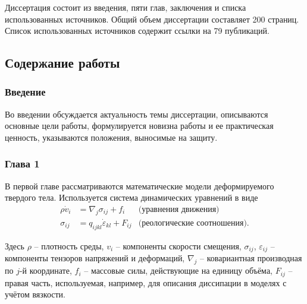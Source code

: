Диссертация состоит из введения, пяти глав, заключения и списка использованных источников. Общий объем диссертации составляет 200 страниц. Список использованных источников содержит ссылки на 79 публикаций.

\subsection*{Содержание работы}



\subsubsection*{Введение}

Во введении обсуждается актуальность темы диссертации, описываются основные цели работы, формулируется новизна работы и ее практическая ценность, указываются положения, выносимые на защиту.

\subsubsection*{Глава 1}

В первой главе рассматриваются математические модели деформируемого твердого тела. Используется система динамических уравнений в виде
\begin{align}
\label{initial_equations}
\rho\dot{v}_i &= \nabla_j\sigma_{ij}+f_i & \textrm{(уравнения движения)}\nonumber\\
\sigma_{ij} &= q_{ijkl}\dot{\varepsilon}_{kl}+F_{ij} & \textrm{(реологические
соотношения).}
\end{align}

Здесь $\rho$ – плотность среды, $v_i$ – компоненты скорости смещения,
$\sigma_{ij}$, $\varepsilon_{ij}$ -- компоненты тензоров напряжений и деформаций,
$\nabla_j$ – ковариантная производная по $j$-й координате, $f_i$ – массовые
силы, действующие на единицу объёма, $F_{ij}$ -- правая часть, используемая, например, для описания диссипации в моделях с учётом вязкости.

